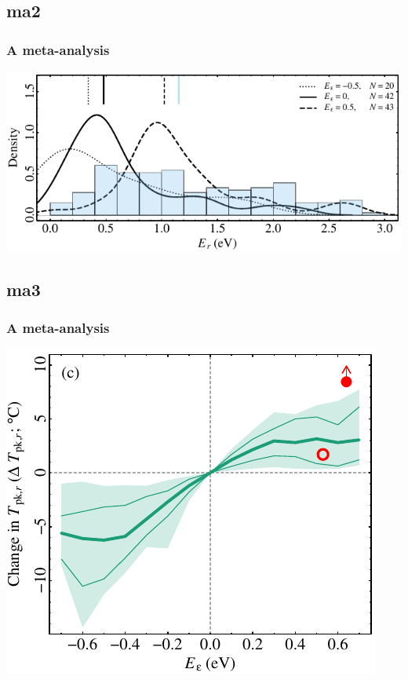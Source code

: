 \documentclass{beamer}
\begin{document}
\subsection{ma2}
\begin{frame}
  \frametitle{A meta-analysis}

  \begin{center}
    \includegraphics{figs/sofia_pres2.pdf}
  \end{center}
\end{frame}



\subsection{ma3}
\begin{frame}
  \frametitle{A meta-analysis}

  \begin{center}
    \includegraphics{figs/sofia_pres3.pdf}
  \end{center}
\end{frame}
\end{document}
